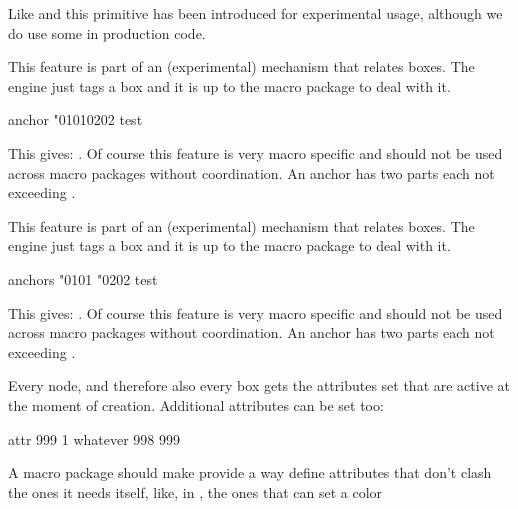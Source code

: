 \typebuffer

Like  and  this primitive has been introduced for
experimental usage, although we do use some in production code.

\getbuffer

\stopnewprimitive

\startnewprimitive[title={\prm {boxanchor}}]

This feature is part of an (experimental) mechanism that relates boxes. The
engine just tags a box and it is up to the macro package to deal with it.

\startbuffer
{}\hbox anchor "01010202 {test}\tohexadecimal{}
\stopbuffer

\typebuffer

This gives: \inlinebuffer. Of course this feature is very macro specific and
should not be used across macro packages without coordination. An anchor has
two parts each not exceeding .

\stopnewprimitive

\startnewprimitive[title={\prm {boxanchors}}]

This feature is part of an (experimental) mechanism that relates boxes. The
engine just tags a box and it is up to the macro package to deal with it.

\startbuffer
{}\hbox anchors "0101 "0202 {test}\tohexadecimal{}
\stopbuffer

\typebuffer

This gives: \inlinebuffer. Of course this feature is very macro specific and
should not be used across macro packages without coordination. An anchor has
two parts each not exceeding .

\stopnewprimitive

\startnewprimitive[title={\prm {boxattribute}}]

Every node, and therefore also every box gets the attributes set that are
active at the moment of creation. Additional attributes can be set too:

\startbuffer
\darkred
{}\hbox attr 999 1 {whatever}
\the{} 
\the{} 998
\the{} 999
\stopbuffer

\typebuffer

A macro package should make provide a way define attributes that don't clash the
ones it needs itself, like, in \CONTEXT, the ones that can set a color

\startlines \getbuffer \stoplines

